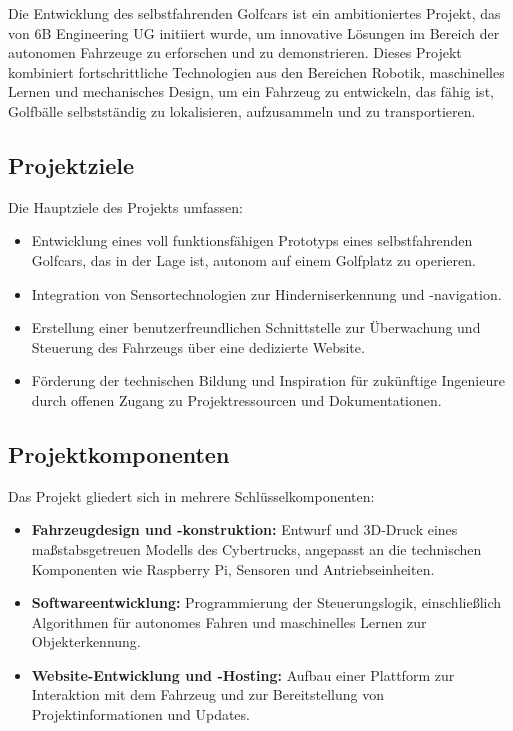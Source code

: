 Die Entwicklung des selbstfahrenden Golfcars ist ein ambitioniertes Projekt, das von 6B Engineering UG initiiert wurde, um innovative Lösungen im Bereich der autonomen Fahrzeuge zu erforschen und zu demonstrieren. Dieses Projekt kombiniert fortschrittliche Technologien aus den Bereichen Robotik, maschinelles Lernen und mechanisches Design, um ein Fahrzeug zu entwickeln, das fähig ist, Golfbälle selbstständig zu lokalisieren, aufzusammeln und zu transportieren.

\subsection{Projektziele}
Die Hauptziele des Projekts umfassen:
\begin{itemize}
  \item Entwicklung eines voll funktionsfähigen Prototyps eines selbstfahrenden Golfcars, das in der Lage ist, autonom auf einem Golfplatz zu operieren.
  \item Integration von Sensortechnologien zur Hinderniserkennung und -navigation.
  \item Erstellung einer benutzerfreundlichen Schnittstelle zur Überwachung und Steuerung des Fahrzeugs über eine dedizierte Website.
  \item Förderung der technischen Bildung und Inspiration für zukünftige Ingenieure durch offenen Zugang zu Projektressourcen und Dokumentationen.
\end{itemize}

\subsection{Projektkomponenten}
Das Projekt gliedert sich in mehrere Schlüsselkomponenten:
\begin{itemize}
  \item \textbf{Fahrzeugdesign und -konstruktion:} Entwurf und 3D-Druck eines maßstabsgetreuen Modells des Cybertrucks, angepasst an die technischen Komponenten wie Raspberry Pi, Sensoren und Antriebseinheiten.
  \item \textbf{Softwareentwicklung:} Programmierung der Steuerungslogik, einschließlich Algorithmen für autonomes Fahren und maschinelles Lernen zur Objekterkennung.
  \item \textbf{Website-Entwicklung und -Hosting:} Aufbau einer Plattform zur Interaktion mit dem Fahrzeug und zur Bereitstellung von Projektinformationen und Updates.
\end{itemize}

